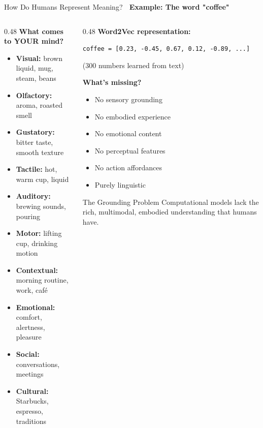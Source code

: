 \documentclass[aspectratio=169]{beamer}
\begin{document}
\begin{frame}[shrink=10]{How Do Humans Represent Meaning? 🧠}
\textbf{Example: The word "coffee"}

\vspace{1em}

\begin{columns}[T]
\begin{column}{0.48\textwidth}
\textbf{What comes to YOUR mind?}
\begin{itemize}\setlength{\itemsep}{0pt}
    \item \textbf{Visual:} brown liquid, mug, steam, beans
    \item \textbf{Olfactory:} aroma, roasted smell
    \item \textbf{Gustatory:} bitter taste, smooth texture
    \item \textbf{Tactile:} hot, warm cup, liquid
    \item \textbf{Auditory:} brewing sounds, pouring
    \item \textbf{Motor:} lifting cup, drinking motion
    \item \textbf{Contextual:} morning routine, work, café
    \item \textbf{Emotional:} comfort, alertness, pleasure
    \item \textbf{Social:} conversations, meetings
    \item \textbf{Cultural:} Starbucks, espresso, traditions
\end{itemize}
\end{column}

\begin{column}{0.48\textwidth}
\textbf{Word2Vec representation:}

\vspace{0.5em}
\texttt{coffee = [0.23, -0.45, 0.67, 0.12, -0.89, ...]}

\vspace{0.5em}
(300 numbers learned from text)

\vspace{1em}
\textbf{What's missing?}
\begin{itemize}\setlength{\itemsep}{0pt}
    \item No sensory grounding
    \item No embodied experience
    \item No emotional content
    \item No perceptual features
    \item No action affordances
    \item Purely linguistic
\end{itemize}

\vspace{1em}
\begin{alertblock}{The Grounding Problem}
Computational models lack the rich, multimodal, embodied understanding that humans have.
\end{alertblock}
\end{column}
\end{columns}
\end{frame}
\end{document}
